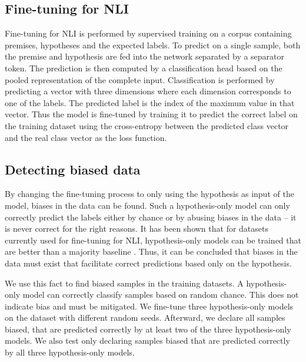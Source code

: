 \subsection{Fine-tuning for \acs{NLI}}

Fine-tuning for \acs{NLI} is performed by supervised training on a corpus containing premises, hypotheses and the expected labels. To predict on a single sample, both the premise and hypothesis are fed into the network separated by a separator token. The prediction is then computed by a classification head based on the pooled representation of the complete input. Classification is performed by predicting a vector with three dimensions where each dimension corresponds to one of the labels. The predicted label is the index of the maximum value in that vector. Thus the model is fine-tuned by training it to predict the correct label on the training dataset using the cross-entropy between the predicted class vector and the real class vector as the loss function.

\subsection{Detecting biased data} \label{sec:method:detecting_biased_data}

By changing the fine-tuning process to only using the hypothesis as input of the model, biases in the data can be found. Such a hypothesis-only model can only correctly predict the labels either by chance or by abusing biases in the data -- it is never correct for the right reasons. It has been shown that for datasets currently used for fine-tuning for \acs{NLI}, hypothesis-only models can be trained that are better than a majority baseline \citep{hyponly}. Thus, it can be concluded that biases in the data must exist that facilitate correct predictions based only on the hypothesis.

We use this fact to find biased samples in the training datasets. A hypothesis-only model can correctly classify samples based on random chance. This does not indicate bias and must be mitigated. We fine-tune three hypothesis-only models on the dataset with different random seeds. Afterward, we declare all samples biased, that are predicted correctly by at least two of the three hypothesis-only models. We also test only declaring samples biased that are predicted correctly by all three hypothesis-only models.


